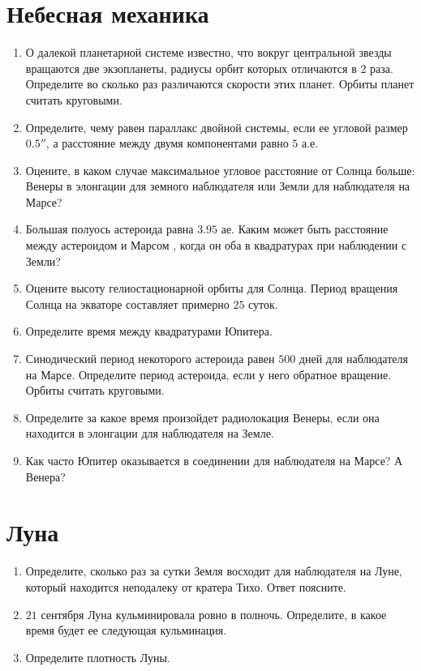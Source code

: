 \documentclass[11pt]{article}
\begin{document}
\section*{Небесная механика}
\begin{enumerate}[resume]
	\item О далекой планетарной системе известно, что вокруг центральной звезды вращаются две экзопланеты, радиусы орбит которых отличаются в 2 раза. Определите во сколько раз различаются скорости этих планет. Орбиты планет считать круговыми.
    \item Определите, чему равен параллакс двойной системы, если ее угловой размер $0.5''$, а расстояние между двумя компонентами равно $5$ а.е.
    \item Оцените, в каком случае максимальное угловое расстояние от Солнца больше: Венеры в элонгации для земного наблюдателя или Земли для наблюдателя на Марсе?
    \item Большая полуось астероида равна $3.95$ ае. Каким может быть расстояние между астероидом и Марсом , когда он оба в квадратурах при наблюдении с Земли?
    \item Оцените высоту гелиостационарной орбиты для Солнца. Период вращения Солнца на экваторе составляет примерно $25$ суток.
    \item Определите время между квадратурами Юпитера.
    \item Синодический период некоторого астероида равен $500$ дней для наблюдателя на Марсе. Определите период астероида, если у него обратное вращение. Орбиты считать круговыми.
    \item Определите за какое время произойдет радиолокация Венеры, если она находится в элонгации для наблюдателя на Земле.
    \item Как часто Юпитер оказывается в соединении для наблюдателя на Марсе? А Венера?
\end{enumerate}

\section*{Луна}
\begin{enumerate}[resume]
	\item Определите, сколько раз за сутки Земля восходит для наблюдателя на Луне, который находится неподалеку от кратера Тихо. Ответ поясните.
    \item $21$ сентября Луна кульминировала ровно в полночь. Определите, в какое время будет ее следующая кульминация.
    \item Определите плотность Луны.
\end{enumerate}
\end{document}
